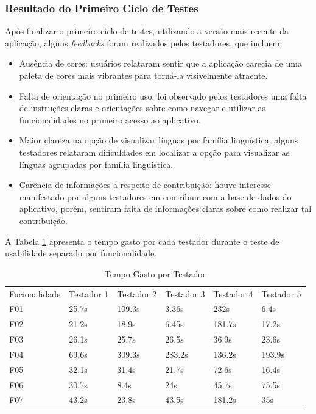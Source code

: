 \subsubsection{Resultado do Primeiro Ciclo de Testes}
\label{sec:Resultado do Primeiro Ciclo de Testes}
Após finalizar o primeiro ciclo de testes, utilizando a versão mais recente da aplicação, alguns \textit{feedbacks} foram realizados pelos testadores, que incluem:

\begin{itemize}
	\item Ausência de cores: usuários relataram sentir que a aplicação carecia de uma paleta de cores mais vibrantes para torná-la visivelmente atraente.
	\item Falta de orientação no primeiro uso: foi observado pelos testadores uma falta de instruções claras e orientações sobre como navegar e utilizar as funcionalidades no primeiro acesso ao aplicativo.
	\item Maior clareza na opção de visualizar línguas por família linguística: alguns testadores relataram dificuldades em localizar a opção para visualizar as línguas agrupadas por família linguística.
	\item Carência de informações a respeito de contribuição: houve interesse manifestado por alguns testadores em contribuir com a base de dados do aplicativo, porém, sentiram falta de informações claras sobre 
	como realizar tal contribuição. 
\end{itemize}

A Tabela \ref{tab04} apresenta o tempo gasto por cada testador durante o teste de usabilidade separado por funcionalidade.

\begin{table}[h!]
	\centering
	\caption{Tempo Gasto por Testador}
	\label{tab04}
	\begin{tabular}{l|l|l|l|l|l}
	Fucionalidade & Testador 1 & Testador 2 & Testador 3 & Testador 4 & Testador 5 \\
	F01                   & 25.7s     & 109.3s     & 3.36s      & 232s       & 6.4s      \\
	F02                   & 21.2s        & 18.9s      & 6.45s      & 181.7s    & 17.2s     \\
	F03                   & 26.1s        & 25.7s      & 26.5s      & 36.9s     & 23.6s     \\
	F04                   & 69.6s        & 309.3s     & 283.2s     & 136.2s     & 193.9s     \\
	F05                   & 32.1s      & 31.4s      & 21.7s     & 72.6s     & 16.4s     \\
	F06                   & 30.7s     & 8.4s      & 24s     & 45.7s     & 75.5s     \\
	F07                   & 43.2s     & 23.8s      & 43.5s     & 181.2s    & 35s       
	\end{tabular}
\end{table}



